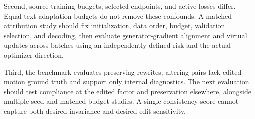 Second, source training budgets, selected endpoints, and active losses differ.
Equal text-adaptation budgets do not remove these confounds. A matched
attribution study should fix initialization, data order, budget, validation
selection, and decoding, then evaluate generator-gradient alignment and
virtual updates across batches using an independently defined risk and the
actual optimizer direction.

Third, the benchmark evaluates preserving rewrites; altering pairs lack edited
motion ground truth and support only internal diagnostics. The next evaluation
should test compliance at the edited factor and preservation elsewhere,
alongside multiple-seed and matched-budget studies. A single consistency
score cannot capture both desired invariance and desired edit sensitivity.